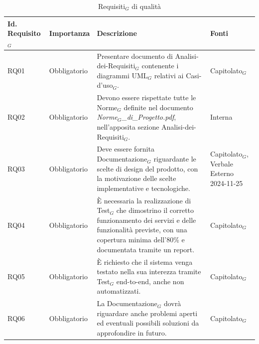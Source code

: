 \documentclass[11pt]{article}
\begin{document}
\begin{justify}
\begin{table}[H]
\centering
\renewcommand{\arraystretch}{1.5}
\begin{tabular}{|>{\centering\arraybackslash}m{2.7cm}|>{\centering\arraybackslash}m{2.7cm}|>{\centering\arraybackslash}m{6cm}|>{\centering\arraybackslash}m{2.1cm}|}
\hline
\textbf{Id. Requisito$_G$} & \textbf{Importanza} & \textbf{Descrizione} & \textbf{Fonti}\\
\hline
RQ01 & Obbligatorio & Presentare documento di Analisi-dei-Requisiti$_G$ contenente i diagrammi UML$_G$ relativi ai Casi-d'uso$_G$. & Capitolato$_G$\\
\hline
RQ02 & Obbligatorio & Devono essere rispettate tutte le Norme$_G$ definite nel documento \textit{Norme$_G$\_di\_Progetto.pdf}, nell'apposita sezione Analisi-dei-Requisiti$_G$. & Interna\\
\hline
RQ03 & Obbligatorio & Deve essere fornita Documentazione$_G$ riguardante le scelte di design del prodotto, con la motivazione delle scelte implementative e tecnologiche. & Capitolato$_G$, Verbale Esterno 2024-11-25\\
\hline
RQ04 & Obbligatorio & È necessaria la realizzazione di Test$_G$ che dimostrino il corretto funzionamento dei servizi e delle funzionalità previste, con una copertura minima dell'80\% e documentata tramite un report.  & Capitolato$_G$\\
\hline
RQ05 & Obbligatorio & È richiesto che il sistema venga testato nella sua interezza tramite Test$_G$ end-to-end, anche non automatizzati.  & Capitolato$_G$\\
\hline
RQ06 & Obbligatorio & La Documentazione$_G$ dovrà riguardare anche problemi aperti ed eventuali possibili soluzioni da approfondire in futuro.  & Capitolato$_G$\\
\hline
\end{tabular}
\caption{Requisiti$_G$ di qualità}
\end{table}

\newpage

\end{justify}
\end{document}
